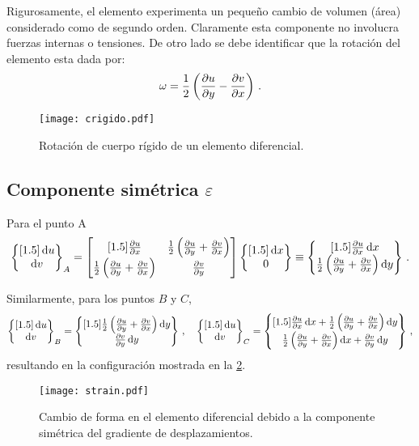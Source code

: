 \documentclass[../notas medios.tex]{subfiles}
\begin{document}
Rigurosamente, el elemento experimenta un pequeño cambio de volumen (área) 
considerado como de segundo orden. Claramente esta componente no involucra 
fuerzas internas o tensiones. De otro lado se debe identificar que la rotación 
del elemento esta dada por:
\[\omega = \frac{1}{2}\left(\pdv{u}{y} - \pdv{v}{x}\right)\, .\]
\begin{figure}[H]
\centering
	\texttt{[image: crigido.pdf]}
	\caption{Rotación de cuerpo rígido de un elemento diferencial.}
	\label{crigido}
\end{figure}

\subsection{Componente simétrica $\varepsilon$}
Para el punto A
\[\begin{Bmatrix}[1.5]
\dd{u}\\
\dd{v}
\end{Bmatrix}_A = \begin{bmatrix}[1.5]
\pdv{u}{x} &\frac{1}{2}\left(\pdv{u}{y} + \pdv{v}{x}\right)\\
\frac{1}{2}\left(\pdv{u}{y} + \pdv{v}{x}\right) &\pdv{v}{y}
\end{bmatrix} \begin{Bmatrix}[1.5]
\dd{x}\\
0
\end{Bmatrix} \equiv \begin{Bmatrix}[1.5]
\pdv{u}{x}\dd{x}\\
\frac{1}{2}\left(\pdv{u}{y} + \pdv{v}{x}\right)\dd{y}
\end{Bmatrix}\, .\]

Similarmente, para los puntos $B$ y $C$,
\[\begin{Bmatrix}[1.5]
\dd{u}\\
\dd{v}
\end{Bmatrix}_B = \begin{Bmatrix}[1.5]
\frac{1}{2}\left(\pdv{u}{y} + \pdv{v}{x}\right)\dd{y}\\
\pdv{v}{y}\dd{y}
\end{Bmatrix}\, ,\quad
\begin{Bmatrix}[1.5]
\dd{u}\\
\dd{v}
\end{Bmatrix}_C = \begin{Bmatrix}[1.5]
\pdv{u}{x}\dd{x} + \frac{1}{2}\left(\pdv{u}{y} + \pdv{v}{x}\right)\dd{y}\\
\frac{1}{2}\left(\pdv{u}{y} + \pdv{v}{x}\right)\dd{x} + \pdv{v}{y}\dd{y}
\end{Bmatrix}\, ,\]
resultando en la configuración mostrada en la \cref{strain}.
\begin{figure}[H]
\centering
	\texttt{[image: strain.pdf]}
	\caption{Cambio de forma en el elemento diferencial debido a la componente simétrica del gradiente de desplazamientos.}
	\label{strain}
\end{figure}
\end{document}
